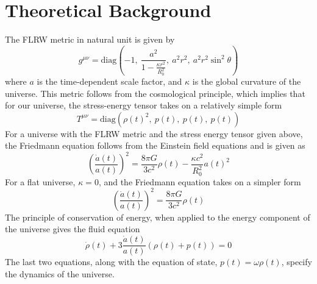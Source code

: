 \documentclass[preprint,aps,floatfix]{revtex4}
\begin{document}
    \section{Theoretical Background}\label{background}
\noindent
    The FLRW metric in natural unit is given by 
    \begin{equation}
        g^{\mu\nu} = \text{diag}\left( -1,~ \frac{a^2}{1 - \displaystyle\frac{\kappa r^2}{R_0^2}},~a^2r^2,~ a^2r^2\sin^2\theta \right)
    \end{equation}
    where $a$ is the time-dependent scale factor, and $\kappa$ is the global curvature of the universe. This metric follows from the cosmological principle, which implies that for our universe, the stress-energy tensor takes on a relatively simple form 
%
    \begin{equation}
        T^{\mu\nu} = \text{diag}( \rho(t)^2,~ p(t),~ p(t),~ p(t) )
    \end{equation}
    For a universe with the FLRW metric and the stress energy tensor given above, the Friedmann equation follows from the Einstein field equations and is given as 
%
    \begin{equation}
        \left( \frac{\dot{a}(t)}{a(t)} \right)^2 = \frac{8\pi G}{3c^2}\rho(t) - \frac{\kappa c^2}{R_0^2}a(t)^2
    \end{equation}
    For a flat universe, $\kappa = 0$, and the Friedmann equation takes on a simpler form 
%
    \begin{equation}
        \left( \frac{\dot{a}(t)}{a(t)} \right)^2 = \frac{8\pi G}{3c^2}\rho(t)
    \end{equation}
%
    The principle of conservation of energy, when applied to the energy component of the universe gives the fluid equation
%
    \begin{equation}
        \dot{\rho}(t)  + 3\frac{\dot{a}(t)}{a(t)}\left(\rho(t) + p(t)\right) = 0
    \end{equation}
    The last two equations, along with the equation of state, $p(t)=\omega \rho(t)$, specify the dynamics of the universe. 
%
%
\end{document}
